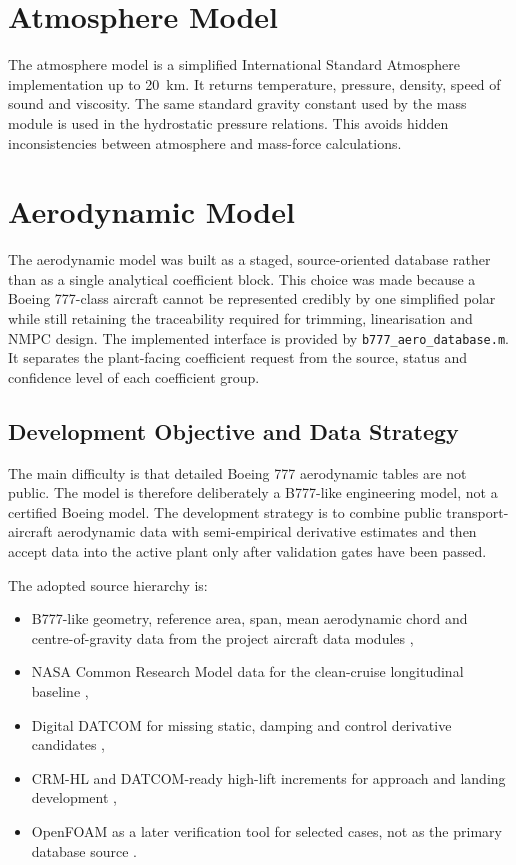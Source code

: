 \section{Atmosphere Model}

The atmosphere model is a simplified International Standard Atmosphere implementation up to \SI{20}{\kilo\metre}. It returns temperature, pressure, density, speed of sound and viscosity. The same standard gravity constant used by the mass module is used in the hydrostatic pressure relations. This avoids hidden inconsistencies between atmosphere and mass-force calculations.

\section{Aerodynamic Model}

The aerodynamic model was built as a staged, source-oriented database rather
than as a single analytical coefficient block. This choice was made because a
Boeing 777-class aircraft cannot be represented credibly by one simplified
polar while still retaining the traceability required for trimming,
linearisation and NMPC design. The implemented interface is provided by
\texttt{b777\_aero\_database.m}. It separates the plant-facing coefficient
request from the source, status and confidence level of each coefficient group.

\subsection{Development Objective and Data Strategy}

The main difficulty is that detailed Boeing 777 aerodynamic tables are not
public. The model is therefore deliberately a B777-like engineering model, not
a certified Boeing model. The development strategy is to combine public
transport-aircraft aerodynamic data with semi-empirical derivative estimates
and then accept data into the active plant only after validation gates have
been passed.

The adopted source hierarchy is:
\begin{itemize}
    \item B777-like geometry, reference area, span, mean aerodynamic chord and
    centre-of-gravity data from the project aircraft data modules
    \cite{boeing777,boeingAirportPlanning},
    \item NASA Common Research Model data for the clean-cruise longitudinal
    baseline \cite{nasaCRM,nasaCRMNtf197,nasaCRMCfdM085},
    \item Digital DATCOM for missing static, damping and control derivative
    candidates \cite{datcomPdas,datcomPdasDescription,datcomPdasDownload},
    \item CRM-HL and DATCOM-ready high-lift increments for approach and landing
    development \cite{nasaCRMHL},
    \item OpenFOAM as a later verification tool for selected cases, not as the
    primary database source \cite{openfoam}.
\end{itemize}

